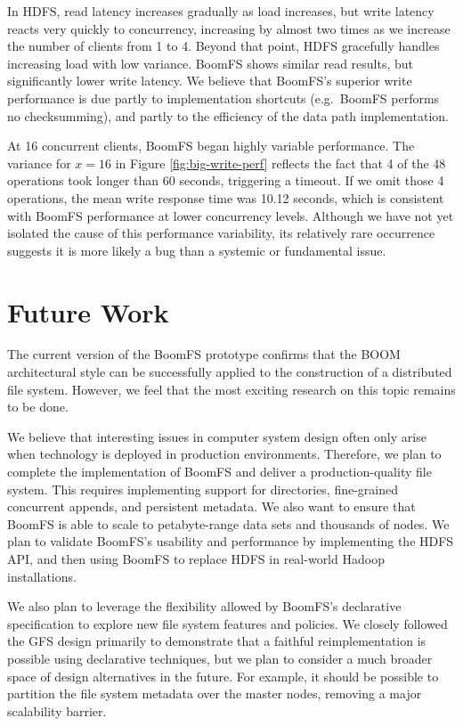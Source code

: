 \documentclass[twocolumn]{article}
\begin{document}
In HDFS, read latency increases gradually as load increases, but write
latency reacts very quickly to concurrency, increasing by almost two
times as we increase the number of clients from 1 to 4.  Beyond that
point, HDFS gracefully handles increasing load with low variance.
BoomFS shows similar read results, but significantly lower write
latency. We believe that BoomFS's superior write performance is due
partly to implementation shortcuts (e.g.\ BoomFS performs no
checksumming), and partly to the efficiency of the data path
implementation.

At 16 concurrent clients, BoomFS began highly variable
performance. The variance for $x=16$ in Figure
\ref{fig:big-write-perf} reflects the fact that 4 of the 48 operations
took longer than 60 seconds, triggering a timeout.  If we omit those 4
operations, the mean write response time was 10.12 seconds, which is
consistent with BoomFS performance at lower concurrency
levels. Although we have not yet isolated the cause of this
performance variability, its relatively rare occurrence suggests it is
more likely a bug than a systemic or fundamental issue.

\section{Future Work}
\label{future-work}
The current version of the BoomFS prototype confirms that the BOOM
architectural style can be successfully applied to the construction of
a distributed file system. However, we feel that the most exciting
research on this topic remains to be done.

We believe that interesting issues in computer system design often
only arise when technology is deployed in production
environments. Therefore, we plan to complete the implementation of
BoomFS and deliver a production-quality file system. This requires
implementing support for directories, fine-grained concurrent appends,
and persistent metadata. We also want to ensure that BoomFS is able to
scale to petabyte-range data sets and thousands of nodes. We plan to
validate BoomFS's usability and performance by implementing the HDFS
API, and then using BoomFS to replace HDFS in real-world Hadoop
installations.

We also plan to leverage the flexibility allowed by BoomFS's
declarative specification to explore new file system features and
policies. We closely followed the GFS design primarily to demonstrate
that a faithful reimplementation is possible using declarative
techniques, but we plan to consider a much broader space of design
alternatives in the future. For example, it should be possible to
partition the file system metadata over the master nodes, removing a
major scalability barrier.
\end{document}
